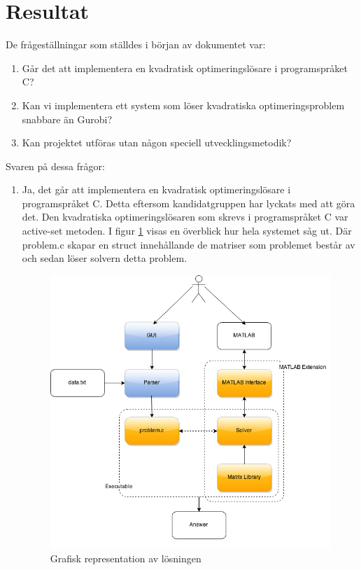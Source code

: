 \section{Resultat}

De frågeställningar som ställdes i början av dokumentet var:
\begin{enumerate}
\item Går det att implementera en kvadratisk optimeringslösare i programspråket C?
\item Kan vi implementera ett system som löser kvadratiska optimeringsproblem snabbare än Gurobi?
\item Kan projektet utföras utan någon speciell utvecklingsmetodik? 
\end{enumerate}

Svaren på dessa frågor:
\begin{enumerate}
\item Ja, det går att implementera en kvadratisk optimeringslösare i programspråket C. Detta eftersom kandidatgruppen har lyckats med att göra det. Den kvadratiska optimeringslösaren som skrevs i programspråket C var active-set metoden. I figur \ref{fig:arkitektur} visas en överblick hur hela systemet såg ut. Där problem.c skapar en struct innehållande de matriser som problemet består av och sedan löser solvern detta problem.

\begin{figure}[h]
\centerline{\includegraphics[scale=0.5]{grafik/arkitektur}}
\caption{Grafisk representation av lösningen}
\label{fig:arkitektur}
\end{figure}


\end{enumerate}
